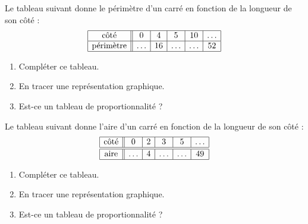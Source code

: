 

\begin{rituel}
    Le tableau suivant donne le périmètre d'un carré en fonction de la longueur de son côté :
    \begin{equation*}
        \begin{array}[]{|c||c|c|c|c|c|}
            \hline
            \text{côté}&0&4&5&10&\ldots\\
            \hline
            \text{périmètre}&\ldots&16&\ldots&\ldots&52\\
            \hline
        \end{array}
    \end{equation*}
    \begin{enumerate}
        \item
            Compléter ce tableau.
        \item
            En tracer une représentation graphique.
        \item
            Est-ce un tableau de proportionnalité ?
    \end{enumerate}
    Le tableau suivant donne l'aire d'un carré en fonction de la longueur de son côté :
    \begin{equation*}
        \begin{array}[]{|c||c|c|c|c|c|}
            \hline
            \text{côté}&0&2&3&5&\ldots\\
            \hline\hline
            \text{aire}&\ldots&4&\ldots&\ldots&49\\
            \hline
        \end{array}
    \end{equation*}
    \begin{enumerate}
        \item
            Compléter ce tableau.
        \item
            En tracer une représentation graphique.
        \item
            Est-ce un tableau de proportionnalité ?
    \end{enumerate}
\end{rituel}
